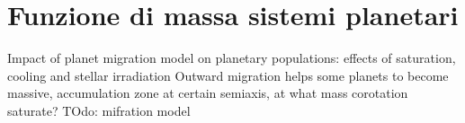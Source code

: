 {\let\clearpage\relax\let\cleardoublepage\relax
\chapter{Funzione di massa sistemi planetari}
}

\begin{frame}{Impact of planet migration model on planetary populations: effects of saturation, cooling and stellar irradiation}
Outward migration helps some planets to become massive, accumulation zone at certain semiaxis, at what mass corotation saturate?
TOdo: mifration model
\end{frame}